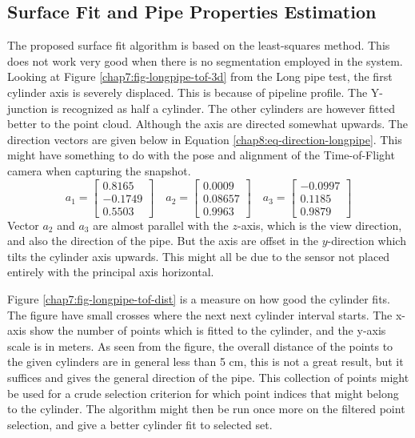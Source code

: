 \subsection{Surface Fit and Pipe Properties Estimation}
The proposed surface fit algorithm is based on the least-squares method. This does not work very good
when there is no segmentation employed in the system. Looking at Figure
\ref{chap7:fig-longpipe-tof-3d} from the Long pipe test, the first cylinder axis is severely displaced. This
is because of pipeline profile. The Y-junction is recognized as half a cylinder. The
other cylinders are however fitted better to the point cloud. Although the axis are 
directed somewhat upwards. The direction vectors are given below in Equation
\eqref{chap8:eq-direction-longpipe}. This might have something to do with the pose and
alignment of the Time-of-Flight camera when capturing the snapshot.
\begin{equation}
    \label{chap8:eq-direction-longpipe}
    a_1 = \left[ \begin{matrix}
                        0.8165\\
                       -0.1749\\
                       0.5503 
                 \end{matrix} \right] \quad a_2 = \left [
                 \begin{matrix}
                       0.0009\\
                       0.08657\\
                       0.9963
                 \end{matrix} \right] \quad a_3 = \left [
                 \begin{matrix}
                       -0.0997\\
                       0.1185\\
                       0.9879
                 \end{matrix} \right]
\end{equation}
Vector $a_2$ and $a_3$ are almost parallel with the $z$-axis, which is the view direction,
and also the direction of the pipe. But the axis are offset in the $y$-direction which tilts
the cylinder axis upwards. This might all be due to the sensor not placed entirely with
the principal axis horizontal. 

Figure \ref{chap7:fig-longpipe-tof-dist} is a measure on how good the cylinder fits. The
figure have small crosses where the next next cylinder interval starts. The x-axis show
the number of points which is fitted to the cylinder, and the y-axis scale is in meters.
As seen from the figure, the overall distance of the points to the given cylinders are in
general less than 5 cm, this is not a great result, but it suffices and gives the general
direction of the pipe. This collection of points might be used for a crude selection
criterion for which point indices that might belong to the cylinder. The algorithm might
then be run once more on the filtered point selection, and give a better cylinder fit to
selected set. 

